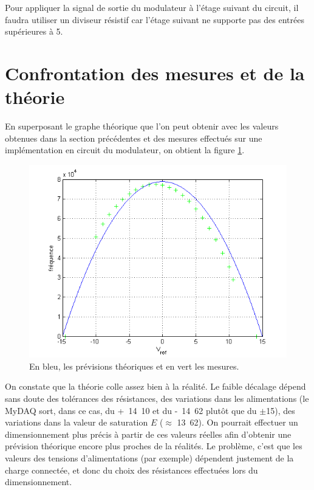 
Pour appliquer la signal de sortie du modulateur
à l'étage suivant du circuit, il faudra utiliser un diviseur
résistif car l'étage suivant ne supporte pas des entrées supérieures
à \unit{5}{\volt}.

\section{Confrontation des mesures et de la théorie}
En superposant le graphe théorique que l'on peut obtenir avec les valeurs
obtenues dans la section précédentes
et des mesures effectués sur une implémentation en circuit
du modulateur, on obtient la figure \ref{fig:sigma-delta-f-vs-vref-dim-vs-real}.

\begin{figure}[ht]
	\centering
	\includegraphics[scale=0.7]{img/sigma-delta-f-vs-vref-dim-vs-real.png}
	\caption{En bleu, les prévisions théoriques et en vert les mesures.}
	\label{fig:sigma-delta-f-vs-vref-dim-vs-real}
\end{figure}

On constate que la théorie colle assez bien à la réalité. Le
faible décalage dépend sans doute des tolérances des résistances,
des variations dans les alimentations (le MyDAQ sort, dans ce cas, du
\unit{+14.10}{\volt} et du \unit{-14.62}{\volt} plutôt que du
$\pm$\unit{15}{\volt}), des variations dans la valeur de saturation
$E$ ($\approx$ \unit{13.62}{\volt}). On pourrait effectuer un
dimensionnement plus précis à partir de ces valeurs réelles afin
d'obtenir une prévision théorique encore plus proches de la réalités.
Le problème, c'est que les valeurs des tensions
d'alimentations (par exemple) dépendent justement de la charge 
connectée, et donc du choix des résistances effectuées lors du dimensionnement.

